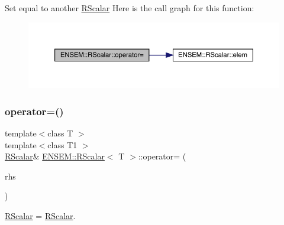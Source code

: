 Set equal to another \mbox{\hyperlink{classENSEM_1_1RScalar}{R\+Scalar}} Here is the call graph for this function\+:
\nopagebreak
\begin{figure}[H]
\begin{center}
\leavevmode
\includegraphics[width=350pt]{d0/d8c/classENSEM_1_1RScalar_a81b105339878a490866e9467135ae4fa_cgraph}
\end{center}
\end{figure}
\mbox{\label{classENSEM_1_1RScalar_a81b105339878a490866e9467135ae4fa}} 
\subsubsection{\texorpdfstring{operator=()}{operator=()}\hspace{0.1cm}{\footnotesize\ttfamily [3/3]}}
{\footnotesize\ttfamily template$<$class T $>$ \\
template$<$class T1 $>$ \\
\mbox{\hyperlink{classENSEM_1_1RScalar}{R\+Scalar}}\& \mbox{\hyperlink{classENSEM_1_1RScalar}{E\+N\+S\+E\+M\+::\+R\+Scalar}}$<$ T $>$\+::operator= (\begin{DoxyParamCaption}\item[{const \mbox{\hyperlink{classENSEM_1_1RScalar}{R\+Scalar}}$<$ T1 $>$ \&}]{rhs }\end{DoxyParamCaption})\hspace{0.3cm}{\ttfamily [inline]}}



\mbox{\hyperlink{classENSEM_1_1RScalar}{R\+Scalar}} = \mbox{\hyperlink{classENSEM_1_1RScalar}{R\+Scalar}}. 

